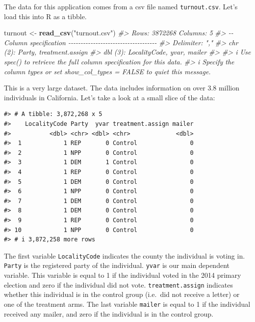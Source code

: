 \documentclass[
]{book}
\newenvironment{Shaded}{\begin{snugshade}}{\end{snugshade}}
\newcommand{\CommentTok}[1]{\textcolor[rgb]{0.56,0.35,0.01}{\textit{#1}}}
\newcommand{\FunctionTok}[1]{\textcolor[rgb]{0.13,0.29,0.53}{\textbf{#1}}}
\newcommand{\NormalTok}[1]{#1}
\newcommand{\OtherTok}[1]{\textcolor[rgb]{0.56,0.35,0.01}{#1}}
\newcommand{\StringTok}[1]{\textcolor[rgb]{0.31,0.60,0.02}{#1}}
\begin{document}
The data for this application comes from a csv file named \texttt{turnout.csv}. Let's load this into R as a tibble.

\begin{Shaded}
\begin{Highlighting}[]
\NormalTok{turnout }\OtherTok{\textless{}{-}} \FunctionTok{read\_csv}\NormalTok{(}\StringTok{"turnout.csv"}\NormalTok{)}
\CommentTok{\#\textgreater{} Rows: 3872268 Columns: 5}
\CommentTok{\#\textgreater{} {-}{-} Column specification {-}{-}{-}{-}{-}{-}{-}{-}{-}{-}{-}{-}{-}{-}{-}{-}{-}{-}{-}{-}{-}{-}{-}{-}{-}{-}{-}{-}{-}{-}{-}{-}{-}{-}{-}{-}}
\CommentTok{\#\textgreater{} Delimiter: ","}
\CommentTok{\#\textgreater{} chr (2): Party, treatment.assign}
\CommentTok{\#\textgreater{} dbl (3): LocalityCode, yvar, mailer}
\CommentTok{\#\textgreater{} }
\CommentTok{\#\textgreater{} i Use \textasciigrave{}spec()\textasciigrave{} to retrieve the full column specification for this data.}
\CommentTok{\#\textgreater{} i Specify the column types or set \textasciigrave{}show\_col\_types = FALSE\textasciigrave{} to quiet this message.}
\end{Highlighting}
\end{Shaded}

This is a very large dataset. The data includes information on over 3.8 million individuals in California. Let's take a look at a small slice of the data:

\begin{verbatim}
#> # A tibble: 3,872,268 x 5
#>    LocalityCode Party  yvar treatment.assign mailer
#>           <dbl> <chr> <dbl> <chr>             <dbl>
#>  1            1 REP       0 Control               0
#>  2            1 NPP       0 Control               0
#>  3            1 DEM       1 Control               0
#>  4            1 REP       0 Control               0
#>  5            1 DEM       0 Control               0
#>  6            1 NPP       0 Control               0
#>  7            1 DEM       0 Control               0
#>  8            1 DEM       0 Control               0
#>  9            1 REP       0 Control               0
#> 10            1 NPP       0 Control               0
#> # i 3,872,258 more rows
\end{verbatim}

The first variable \texttt{LocalityCode} indicates the county the individual is voting in. \texttt{Party} is the registered party of the individual. \texttt{yvar} is our main dependent variable. This variable is equal to 1 if the individual voted in the 2014 primary election and zero if the individual did not vote. \texttt{treatment.assign} indicates whether this individual is in the control group (i.e.~did not receive a letter) or one of the treatment arms. The last variable \texttt{mailer} is equal to 1 if the individual received any mailer, and zero if the individual is in the control group.
\end{document}
